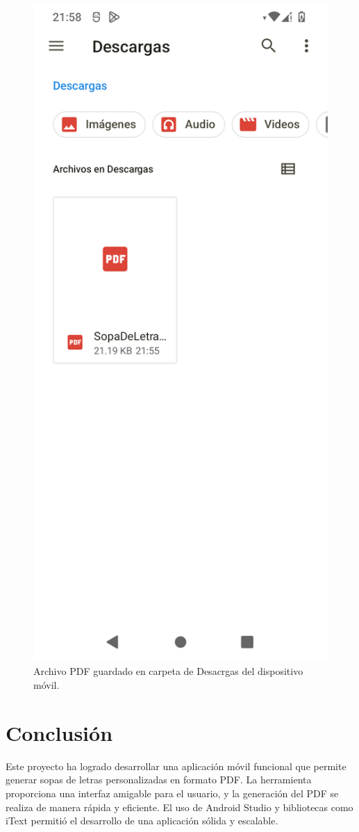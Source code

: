 \documentclass[conference]{IEEEtran}
\begin{document}
\begin{figure}[H]
    \centering
    \includegraphics[width=0.6\columnwidth]{imagenes/archivo.png}
    \caption{Archivo PDF guardado en carpeta de Desacrgas del dispositivo móvil.}
    \label{fig:13}
\end{figure}





\section{Conclusión}
Este proyecto ha logrado desarrollar una aplicación móvil funcional que permite generar sopas de letras personalizadas en formato PDF. La herramienta proporciona una interfaz amigable para el usuario, y la generación del PDF se realiza de manera rápida y eficiente. El uso de Android Studio y bibliotecas como iText permitió el desarrollo de una aplicación sólida y escalable.
\end{document}
